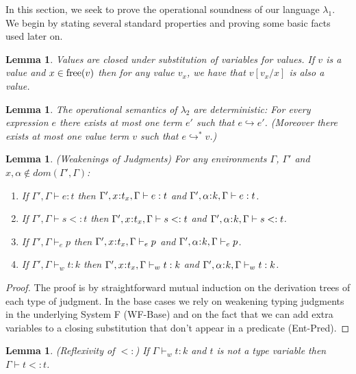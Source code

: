 \documentclass[11pt]{article}
\newtheorem{lemma}[theorem]{Lemma}
\newcommand{\al}{\alpha}
\newcommand{\bind}{\hspace{0.05em}{:}\hspace{0.05em}} %
\newcommand{\step}{\hookrightarrow}
\newcommand{\many}{\hookrightarrow^*}
\begin{document}
In this section, we seek to prove the operational soundness of our language $\lambda_1$. We begin by stating several standard properties and proving some basic facts used later on.

\begin{lemma}\label{value-sub}
Values are closed under substitution of variables for values. If $v$ is a value and $x \in {\rm free}(v)$ then for any value $v_x$, we have that $v[v_x/x]$ is also a value.
\end{lemma}

\begin{lemma}\label{step-determ}
The operational semantics of $\lambda_2$ are deterministic: For every expression $e$ there exists at most one term $e'$ such that $e \step e'$. (Moreover there exists at most one value term $v$ such that $e \many v$.)
\end{lemma}

\begin{lemma}\label{weakenings}
(Weakenings of Judgments) For any environments $\Gamma$, $\Gamma'$ and $x,\al \not\in dom(\Gamma', \Gamma)$:
\begin{enumerate}
\item If $\Gamma', \Gamma \vdash e : t$ then $\Gamma', x\bind t_x, \Gamma \vdash e :  t$ and $\Gamma', \al\bind k, \Gamma \vdash e :  t$.
\item If $\Gamma', \Gamma \vdash s <: t$ then $\Gamma', x\bind t_x, \Gamma \vdash s <: t$ and $\Gamma', \al\bind k, \Gamma \vdash s <: t$.
\item If $\Gamma', \Gamma \vdash_e p$ then $\Gamma', x\bind t_x, \Gamma \vdash_e p$ and $\Gamma', \al\bind k, \Gamma \vdash_e p$.
\item If $\Gamma', \Gamma \vdash_w t:k$ then $\Gamma', x\bind t_x, \Gamma \vdash_w t:k$ and $\Gamma', \al\bind k, \Gamma \vdash_w t:k$.
\end{enumerate}
\end{lemma}
\begin{proof}
The proof is by straightforward mutual induction on the derivation trees of each type of judgment. In the base cases we rely on weakening typing judgments in the underlying System F ({\sc WF-Base}) and on the fact that we can add extra variables to a closing substitution that don't appear in a predicate ({\sc Ent-Pred}).
\end{proof}

\begin{lemma}\label{sub-refl}
(Reflexivity of $<:$) If $\Gamma \vdash_w t : k$ and $t$ is not a type variable then $\Gamma \vdash t <: t$.
\end{lemma}
\end{document}
